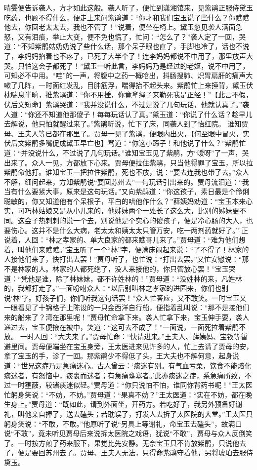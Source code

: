 \documentclass[12pt,oneside]{book}
\begin{document}
晴雯便告诉袭人，方才如此这般。袭人听了，便忙到潇湘馆来，见紫鹃正服侍黛玉吃药，也顾不得什么，便走上来问紫鹃道：“你才和我们宝玉说了些什么？你瞧瞧他去，你回老太太去，我也不管了！”说着，便坐在椅上。黛玉忽见袭人满面急怒，又有泪痕，举止大变，便不免也慌了，忙问：“怎么了？”袭人定了一回，哭道：“不知紫鹃姑奶奶说了些什么话，那个呆子眼也直了，手脚也冷了，话也不说了，李妈妈掐着也不疼了，已死了大半个了！连李妈妈都说不中用了，那里放声大哭。只怕这会子都死了！”黛玉一听此言，李妈妈乃是经过的老妪，说不中用了，可知必不中用。“哇”的一声，将腹中之药一概呛出，抖肠搜肺、炽胃扇肝的痛声大嗽了几阵，一时面红发乱，目肿筋浮，喘得抬不起头来。紫鹃忙上来捶背，黛玉伏枕喘息半晌，推紫鹃道：“你不用捶，你竟拿绳子来勒死我是正经！”【此言不假，伏后文短命】紫鹃哭道：“我并没说什么，不过是说了几句玩话，他就认真了。”袭人道：“你还不知道他那傻子！每每玩话认了真。”黛玉道：“你说了什么话？趁早儿去解说，他只怕就醒过来了。”紫鹃听说，忙下了床，同袭人到了怡红院。
谁知贾母、王夫人等已都在那里了。贾母一见了紫鹃，便眼内出火，【何至眼中冒火，实伏后文紫鹃多嘴促成黛玉早亡也】骂道：“你这小蹄子！和他说了什么？”紫鹃忙道：“并没说什么，不过说了几句玩话。”谁知宝玉见了紫鹃，方“嗳呀”了一声，哭出来了。众人一见，方都放下心来。贾母便拉住紫鹃，只当他得罪了宝玉，所以拉紫鹃命他打。谁知宝玉一把拉住紫鹃，死也不放，说：“要去连我也带了去。”众人不解，细问起来，方知紫鹃说“要回苏州去”一句玩话引出来的。贾母流泪道：“我当有什么要紧大事，原来是这句玩话。”又向紫鹃道：“你这孩子，素日最是个伶俐聪敏的，你又知道他有个呆根子，平白的哄他作什么？”薛姨妈劝道：“宝玉本来心实，可巧林姑娘又是从小儿来的，他姊妹两个一处长了这么大，比别的姊妹更不同。这会子热刺刺的说一个去，别说他是个实心的傻孩子，便是冷心肠的大人，也要伤心。这并不是什么大病，老太太和姨太太只管万安，吃一两剂药就好了。”
正说着，人回：“林之孝家的、单大良家的都来瞧哥儿来了。”贾母道：“难为他们想着，叫他们来瞧瞧。”宝玉听了一个“林”字，便满床闹起来说：“了不得了！林家的人接他们来了，快打出去罢！”贾母听了，也忙说：“打出去罢。”又忙安慰说：“那不是林家的人。林家的人都死绝了，没人来接他的，你只管放心罢！”宝玉哭道：“凭他是谁，除了林妹妹，都不许姓林的！”贾母道：“没姓林的来，凡姓林的，我都打走了。”一面吩咐众人：“以后别叫林之孝家的进园来，你们也别说‘林’字。好孩子们，你们听我这句话罢！”众人忙答应，又不敢笑。一时宝玉又一眼看见了十锦格子上陈设的一只金西洋自行船，便指着乱叫说：“那不是接他们来的船来了？湾在那里呢！”贾母忙命拿下来。袭人忙拿下来，宝玉伸手要，袭人递过去，宝玉便掖在被中，笑道：“这可去不成了！”一面说，一面死拉着紫鹃不放。
一时人回：“大夫来了。”贾母忙命：“快请进来。”王夫人、薛姨妈、宝钗等暂避里间。贾母便端坐在宝玉身旁，王太医进来见许多的人，忙上去请了贾母的安，拿了宝玉的手，诊了一回。那紫鹃少不得低了头，王大夫也不解何意，起身说道：“世兄这症乃是急痛迷心。古人曾云：‘痰迷有别。有气血亏柔，饮食不能熔化痰迷者，有怒恼中，痰裹而迷者；有急痛壅塞者。’此亦痰迷之症，系急痛所致，不过一时壅蔽，较诸痰迷似轻。”贾母道：“你只说怕不怕，谁同你背药书呢！”王太医忙躬身笑说：“不妨，不妨。”贾母道：“果真不妨？”王太医道：“实在不妨，都在晚生身上。”贾母道：“既如此，请到外面坐，开药方。若吃好了，我另外预备好谢礼，叫他亲自捧了，送去磕头；若耽误了，打发人去拆了太医院的大堂。”王太医只躬身笑说：“不敢，不敢。”他原听了说“另具上等谢礼，命宝玉去磕头”，故满口说“不敢”，竟未听见贾母后来说拆太医院之戏语，犹说“不敢”，贾母与众人反倒笑了。一时按方煎了药来服下，果觉比先安静。无奈宝玉只不肯放紫鹃，只说他去了，便是要回苏州去了。贾母、王夫人无法，只得命紫鹃守着他，另将琥珀去服侍黛玉。
\end{document}
